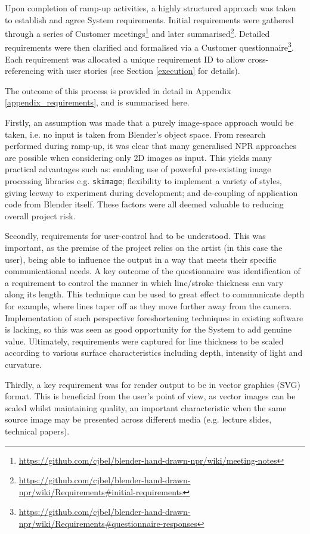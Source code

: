 Upon completion of ramp-up activities, a highly structured approach was taken to establish and agree System requirements.
Initial requirements were gathered through a series of Customer meetings\footnote{\url{https://github.com/cjbel/blender-hand-drawn-npr/wiki/meeting-notes}} and later summarised\footnote{\url{https://github.com/cjbel/blender-hand-drawn-npr/wiki/Requirements#initial-requirements}}.
Detailed requirements were then clarified and formalised via a Customer questionnaire\footnote{\url{https://github.com/cjbel/blender-hand-drawn-npr/wiki/Requirements#questionnaire-responses}}. Each requirement was allocated a unique requirement ID to allow cross-referencing with user stories (see Section \ref{execution} for details).

The outcome of this process is provided in detail in Appendix \ref{appendix_requirements}, and is summarised here.

Firstly, an assumption was made that a purely image-space approach would be taken, i.e. no input is taken from Blender's object space.
From research performed during ramp-up, it was clear that many generalised NPR approaches are possible when considering only 2D images as input.
This yields many practical advantages such as: enabling use of powerful pre-existing image processing libraries e.g. \texttt{skimage}; flexibility to implement a variety of styles, giving leeway to experiment during development; and de-coupling of application code from Blender itself.
These factors were all deemed valuable to reducing overall project risk.

Secondly, requirements for user-control had to be understood.
This was important, as the premise of the project relies on the artist (in this case the user), being able to influence the output in a way that meets their specific communicational needs.
A key outcome of the questionnaire was identification of a requirement to control the manner in which line/stroke thickness can vary along its length.
This technique can be used to great effect to communicate depth for example, where lines taper off as they move further away from the camera.
Implementation of such perspective foreshortening techniques in existing software is lacking, so this was seen as good opportunity for the System to add genuine value.
Ultimately, requirements were captured for line thickness to be scaled according to various surface characteristics including depth, intensity of light and curvature.

Thirdly, a key requirement was for render output to be in vector graphics (SVG) format.
This is beneficial from the user's point of view, as vector images can be scaled whilst maintaining quality, an important characteristic when the same source image may be presented across different media (e.g. lecture slides, technical papers).

